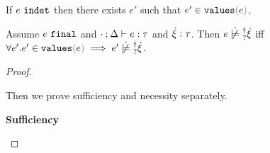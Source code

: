 \begin{lemma}
  \label{lem:invalues-derivable}
  If $e ~\mathtt{indet}$ then there exists $e'$ such that $\inValues{e'}{e}$.
\end{lemma}

\begin{lemma}
  \label{lem:complete-not-satormay}
  Assume $e ~\mathtt{final}$ and $\cdot \mathbin{;} \Delta \vdash e : \tau$ and
  $\dot{\xi} : \tau$. Then $\cnotsatisfyormay{e}{\hxi}$ iff $\forall
  e'.\inValues{e'}{e} \implies \cnotsatisfyormay{e'}{\hxi}$.
  
\end{lemma}
\begin{proof}
  \begin{pfsteps}
  \item {}  
  \item {}  
  \item \ctyp{\hxi}{\tau}  
  \end{pfsteps}
  Then we prove sufficiency and necessity separately.

  \textbf{Sufficiency}
  \begin{pfsteps}
  \item {}  
  \end{pfsteps}


\end{proof}
